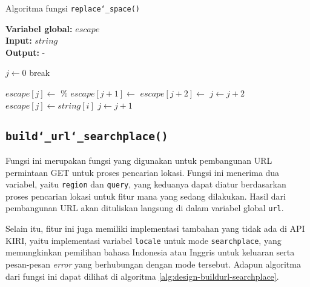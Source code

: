 \begin{algorithm}[h]
	\caption{Algoritma fungsi \texttt{replace\char`_space()}}
	\label{alg:design-replacespace}
	\vspace{-0.6\baselineskip}
	\begin{flushleft}
		\textbf{Variabel global:} $escape$ \\
        \textbf{Input:} $string$ \\
        \textbf{Output:} - \\
	\end{flushleft}
	\vspace{-1.05\baselineskip}
	\begin{algorithmic}
		\State $j \gets 0$
			 
			    \State break 
			\EndIf
		
			\If{$string[i]$ == \textquotesingle\xspace\textquotesingle}
			    \State $escape[j] \gets$ \textquotesingle\%\textquotesingle
			    \State $escape[j + 1] \gets$ \textquotesingle
			    \State $escape[j + 2] \gets$ \textquotesingle
			    \State $j \gets j + 2$ 
			\Else
				\State $escape[j] \gets string[i]$ 
			\EndIf
			\State $j \gets j + 1$
		\EndFor
	\end{algorithmic}
\end{algorithm}

\subsection{\texttt{build\char`_url\char`_searchplace()}}
\label{sec:design-code-buildurl-searchplace}

Fungsi ini merupakan fungsi yang digunakan untuk pembangunan URL permintaan	GET untuk proses pencarian lokasi. Fungsi ini menerima dua variabel, yaitu \verb|region| dan \verb|query|, yang keduanya dapat diatur berdasarkan proses pencarian lokasi untuk fitur mana yang sedang dilakukan. Hasil dari pembangunan URL akan dituliskan langsung di dalam variabel global \verb|url|.
	
	Selain itu, fitur ini juga memiliki implementasi tambahan yang tidak ada di API KIRI, yaitu implementasi variabel \verb|locale| untuk mode \verb|searchplace|, yang memungkinkan pemilihan bahasa Indonesia atau Inggris untuk keluaran serta pesan-pesan \textit{error} yang berhubungan dengan mode tersebut. Adapun algoritma dari fungsi ini dapat dilihat di algoritma \ref{alg:design-buildurl-searchplace}.

